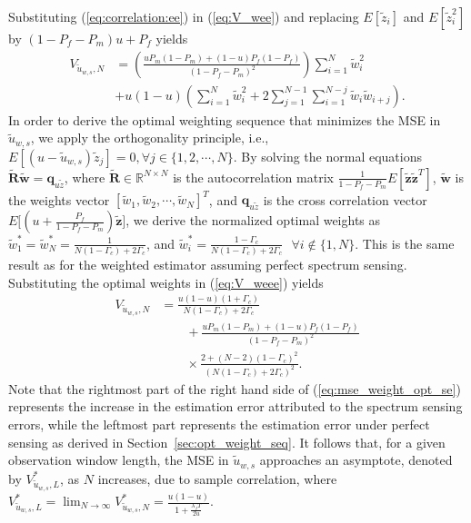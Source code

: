 \documentclass[11pt,draftclsnofoot,journal,onecolumn]{IEEEtran}
\begin{document}
Substituting (\ref{eq:correlation:ee}) in (\ref{eq:V_wee}) and replacing $E[\tilde z_i]$ and $E[\tilde z_i^2]$ by $(1-P_f-P_m)u+P_f$ yields
\begin{align}
V_{\tilde u_{w,s},N} & = \left(\frac{uP_m(1-P_m)+(1-u)P_f(1-P_f)}{(1-P_f-P_m)^2}\right)\sum_{i=1}^N\tilde w_i^2\nonumber\\&+ u(1-u)\left(\sum_{i=1}^N\tilde w_i^2+2\sum_{j=1}^{N-1}\sum_{i=1}^{N-j}\tilde w_i\tilde w_{i+j}\right).
\label{eq:V_weee}
\end{align}
In order to derive the optimal weighting sequence that minimizes the MSE in $\tilde{u}_{w,s}$, we apply the orthogonality principle, i.e., $E[(u-\tilde u_{w,s})\tilde z_j]=0, \forall j\in\{1,2,\cdots,N\}$. By solving the normal equations $\tilde{\mathbf{R}} \tilde{\mathbf{w}} = \mathbf{q}_{u\tilde z}$, where $\tilde{\mathbf{R}} \in {\mathbb{R}}^{N\times N}$ is the autocorrelation matrix $\frac{1}{1-P_f-P_m}E[\mathbf{\tilde z}\mathbf{\tilde z}^{T}]$, $\mathbf{\tilde w}$ is the weights vector $[\tilde w_{1}, \tilde w_{2},\cdots,\tilde w_{N}]^{T}$, and $\mathbf{q}_{u\tilde z}$ is the cross correlation vector $E\Big[\left(u+\frac{P_f}{1-P_f-P_m}\right)\mathbf{\tilde z}\Big]$, we derive the normalized optimal weights as $\tilde w_{1}^* = \tilde w_{N}^* = \frac{1}{N(1-\Gamma_c)+2\Gamma_c}$, and $\tilde w_{i}^* = \frac{1-\Gamma_c}{N(1-\Gamma_c)+2\Gamma_c} \text{ } \forall i \notin \{1,N\}$. This is the same result as for the weighted estimator assuming perfect spectrum sensing. Substituting the optimal weights in (\ref{eq:V_weee}) yields
\begin{align}
V_{\tilde u_{w,s},N} & = \frac{u(1-u)(1+\Gamma_c)}{N(1-\Gamma_c)+2\Gamma_c}\nonumber\\&\qquad + \frac{uP_m(1-P_m)+(1-u)P_f(1-P_f)}{(1-P_f-P_m)^2}\nonumber\\&\qquad\times \frac{2+(N-2)(1-\Gamma_c)^2}{(N(1-\Gamma_c)+2\Gamma_c)^2}.
\label{eq:mse_weight_opt_se}
\end{align}
Note that the rightmost part of the right hand side of (\ref{eq:mse_weight_opt_se}) represents the increase in the estimation error attributed to the spectrum sensing errors, while the leftmost part represents the estimation error under perfect sensing as derived in Section~\ref{sec:opt_weight_seq}. It follows that, for a given observation window length, the MSE in $\tilde{u}_{w,s}$ approaches an asymptote, denoted by $V_{\tilde{u}_{w,s},L}^*$, as $N$ increases, due to sample correlation, where $V_{\tilde{u}_{w,s},L}^* = \lim_{N\to\infty} V_{\tilde{u}_{w,s},N}^* = \frac{u(1-u)}{1+\frac{\lambda_f T}{2u}}$.
\end{document}
